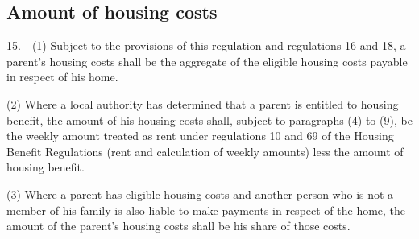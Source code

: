 \documentclass[a4paper]{article}
\begin{document}
\subsection[15. Amount of housing costs]{Amount of housing costs}

15.—(1) Subject to the provisions of this regulation and 
regulations 16 and 18,  %
a parent’s housing costs shall be the aggregate of the eligible housing costs payable in respect of his home.

(2) Where a local authority has determined that a parent is entitled to housing benefit, the amount of his housing costs shall, subject to paragraphs (4) to (9), be the weekly amount treated as rent under regulations 10 and 69 of the Housing Benefit Regulations (rent and calculation of weekly amounts) less the amount of housing benefit.

(3) Where a parent has eligible housing costs and another person who is not a member of his family is also liable to make payments in respect of the home, the amount of the parent’s housing costs shall be his share of those costs.
\end{document}
